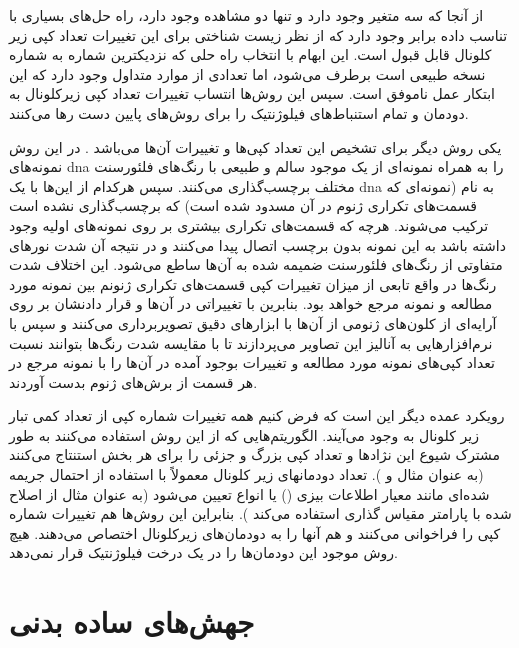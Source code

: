 از آنجا که سه متغیر وجود دارد و تنها دو مشاهده وجود دارد، راه حل‌های بسیاری با تناسب داده برابر وجود دارد که از نظر زیست شناختی برای این تغییرات تعداد کپی زیر کلونال قابل قبول است. این ابهام با انتخاب راه حلی که نزدیکترین شماره به شماره نسخه طبیعی است برطرف می‌شود، اما تعدادی از موارد متداول وجود دارد که این ابتکار عمل ناموفق است. سپس این روش‌ها انتساب تغییرات تعداد کپی زیرکلونال به دودمان و تمام استنباط‌های فیلوژنتیک را برای روش‌های پایین دست رها می‌کنند.

یکی روش دیگر برای تشخیص این تعداد کپی‌ها و تغییرات آن‌ها  می‌باشد \cite{butler2008array}. در این روش نمونه‌های \gls{dna} را به همراه نمونه‌ای از یک موجود سالم و طبیعی با رنگ‌های فلئورسنت مختلف برچسب‌گذاری می‌کنند. سپس هرکدام از این‌ها با یک \gls{dna} به نام  (نمونه‌ای که قسمت‌های تکراری ژنوم در آن مسدود شده است) که برچسب‌گذاری نشده است ترکیب می‌شوند. هرچه که قسمت‌های تکراری بیشتری بر روی نمونه‌های اولیه وجود داشته باشد به این نمونه بدون برچسب اتصال پیدا می‌کنند و در نتیجه آن شدت نورهای متفاوتی از رنگ‌های فلئورسنت ضمیمه شده به آن‌ها ساطع می‌شود. این اختلاف شدت رنگ‌ها در واقع تابعی از میزان تغییرات کپی قسمت‌های تکراری ژنونم بین نمونه مورد مطالعه و نمونه مرجع خواهد بود. بنابرین با تغییراتی در آن‌ها و قرار دادنشان بر روی آرایه‌ای از کلون‌های ژنومی از آن‌ها با ابزارهای دقیق تصویربرداری می‌کنند و سپس با نرم‌افزارهایی به آنالیز این تصاویر می‌پردازند تا با مقایسه شدت رنگ‌ها بتوانند نسبت تعداد کپی‌های نمونه مورد مطالعه و تغییرات بوجود آمده در آن‌ها را با نمونه مرجع در هر قسمت از برش‌های ژنوم بدست آوردند.

رویکرد عمده دیگر این است که فرض کنیم همه تغییرات شماره کپی از تعداد کمی تبار زیر کلونال به وجود می‌آیند. الگوریتم‌هایی که از این روش استفاده می‌کنند به طور مشترک شیوع این نژادها و تعداد کپی بزرگ و جزئی را برای هر بخش استنتاج می‌کنند (به عنوان مثال \cite{zhu2011metabolic, vander2009understanding} و ). تعداد دودمانهای زیر کلونال معمولاً با استفاده از احتمال جریمه شده‌ای مانند معیار اطلاعات بیزی () یا انواع  تعیین می‌شود (به عنوان مثال  از  اصلاح شده با پارامتر مقیاس گذاری استفاده می‌کند \cite{zhu2011metabolic}). بنابراین این روش‌ها هم تغییرات شماره کپی را فراخوانی می‌کنند و هم آنها را به دودمان‌های زیرکلونال اختصاص می‌دهند. هیچ روش موجود این دودمان‌ها را در یک درخت فیلوژنتیک قرار نمی‌دهد.



\section{جهش‌های ساده بدنی}


